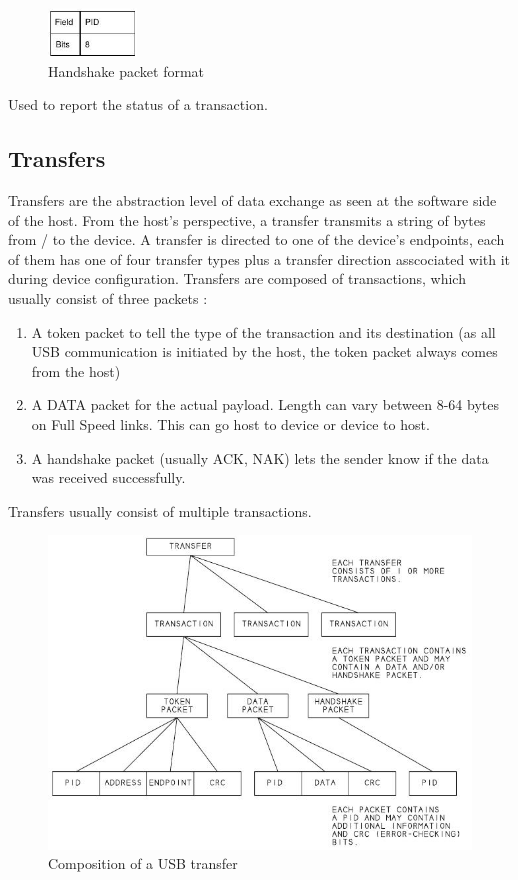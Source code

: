 \documentclass{article}
\begin{document}
\begin{figure}[H]
  \caption{Handshake packet format \cite[p. 206]{usbstd}}
  \centering
  \includegraphics[width=0.21\textwidth]{images/handshake_packet.jpg}
\end{figure}

Used to report the status of a transaction.

\subsection{Transfers}

Transfers are the abstraction level of data exchange as seen at the software
side of the host. From the host's perspective, a transfer transmits a string of
 bytes from / to the device. A transfer is directed to one of the device's endpoints,
each of them has one of four transfer types plus a transfer direction
asscociated with it during device configuration.
Transfers are composed of transactions, which usually consist of three
packets \cite[p. 209ff.]{usbstd}:

\begin{enumerate}
  \item A token packet to tell the type of the transaction and its destination
        (as all USB communication is initiated by the host, the token packet always comes
        from the host)
  \item A DATA packet for the actual payload. Length can vary between 8-64 bytes on Full Speed links.
        This can go host to device or device to host.
  \item A handshake packet (usually ACK, NAK) lets the sender know if the data was received successfully.
\end{enumerate}

Transfers usually consist of multiple transactions.

\begin{figure}[H]
  \caption{Composition of a USB transfer \cite[p. 44]{uc}}
  \centering
  \includegraphics[width=\textwidth]{images/transfer_tree.jpg}
\end{figure}
\end{document}
